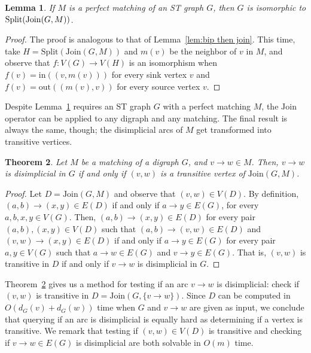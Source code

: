 \documentclass[a4paper,11pt]{article}
\newtheorem{theorem}{Theorem}
\newtheorem{lemma}[theorem]{Lemma}
\newcommand{\SPLIT}{\ensuremath{\mathrm{Split}}}
\newcommand{\JOIN}{\ensuremath{\mathrm{Join}}}
\newcommand{\IN}{\ensuremath{\mathrm{in}}}
\newcommand{\OUT}{\ensuremath{\mathrm{out}}}
\begin{document}
\begin{lemma}\label{lem:join then bip}
  If $M$ is a perfect matching of an ST graph $G$, then $G$ is isomorphic to\/ $\SPLIT(\penalty0\JOIN(\penalty0G, M))$.
\end{lemma}

\begin{proof}
  The proof is analogous to that of Lemma~\ref{lem:bip then join}.  This time, take $H = \SPLIT(\JOIN(G, M))$ and $m(v)$ be the neighbor of $v$ in $M$, and observe that $f\colon V(G) \to V(H)$ is an isomorphism when $f(v) = \IN((v, m(v)))$ for every sink vertex $v$ and $f(v) = \OUT((m(v), v))$ for every source vertex $v$.
\end{proof}

Despite Lemma~\ref{lem:join then bip} requires an ST graph $G$ with a perfect matching $M$, the $\JOIN$ operator can be applied to any digraph and any matching.  The final result is always the same, though; the disimplicial arcs of $M$ get transformed into transitive vertices.

\begin{theorem}\label{thm:disimplicial is transitive}
  Let $M$ be a matching of a digraph $G$, and $v \to w \in M$.  Then, $v \to w$ is disimplicial in $G$ if and only if $(v,w)$ is a transitive vertex of\/ $\JOIN(G, M)$.
\end{theorem}

\begin{proof}
  Let $D = \JOIN(G, M)$ and observe that $(v,w) \in V(D)$.  By definition, $(a,b) \to (x,y) \in E(D)$ if and only if $a \to y \in E(G)$, for every $a,b,x,y \in V(G)$.  Then, $(a,b) \to (x,y) \in E(D)$ for every pair $(a,b), (x,y) \in V(D)$ such that $(a, b) \to (v,w) \in E(D)$ and $(v,w) \to (x,y) \in E(D)$ if and only if $a \to y \in E(G)$ for every pair $a, y \in V(G)$ such that $a \to w \in E(G)$ and $v \to y \in E(G)$.  That is, $(v,w)$ is transitive in $D$ if and only if $v \to w$ is disimplicial in $G$.
\end{proof}

Theorem~\ref{thm:disimplicial is transitive} gives us a method for testing if an arc $v \to w$ is disimplicial: check if $(v,w)$ is transitive in $D = \JOIN(G, \{v \to w\})$.  Since $D$ can be computed in $O(d_G(v) + d_G(w))$ time when $G$ and $v \to w$ are given as input, we conclude that querying if an arc is disimplicial is equally hard as determining if a vertex is transitive.  We remark that testing if $(v,w) \in V(D)$ is transitive and checking if $v \to w \in E(G)$ is disimplicial are both solvable in $O(m)$ time.
\end{document}
